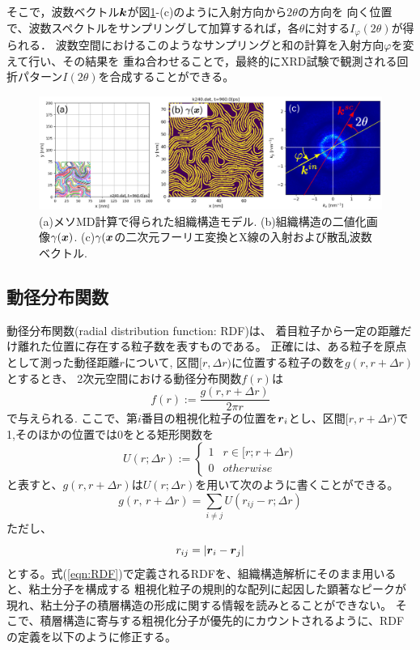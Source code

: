 そこで，波数ベクトル$\mbox{\boldmath $k$}$が図\ref{fig:fig5}-(c)のように入射方向から$2\theta$の方向を
向く位置で、波数スペクトルをサンプリングして加算するれば，各$\theta$に対する$I_\varphi(2\theta)$が得られる．
波数空間におけるこのようなサンプリングと和の計算を入射方向$\varphi$を変えて行い、その結果を
重ね合わせることで，最終的にXRD試験で観測される回折パターン$I(2\theta)$を合成することができる。
\begin{figure}[h]
	\begin{center}
	\includegraphics[width=1.0\linewidth]{Figs/fig5.eps} 
	\end{center}
	\caption{
		(a)メソMD計算で得られた組織構造モデル.
		(b)組織構造の二値化画像$\gamma(\mbox{\boldmath $x$})$. 
		(c)$\gamma(\mbox{\boldmath $x$}$の二次元フーリエ変換とX線の入射および散乱波数ベクトル.
	} 
	\label{fig:fig5}
\end{figure}
\subsection{動径分布関数}
動径分布関数(radial distribution function: RDF)は、
着目粒子から一定の距離だけ離れた位置に存在する粒子数を表すものである。
正確には、ある粒子を原点として測った動径距離$r$について,
区間$[r,\Delta r)$に位置する粒子の数を$g(r,r+\Delta r)$とするとき、
2次元空間における動径分布関数$f(r)$は
\begin{equation}
	f(r):=\frac{g(r,r+\Delta r)}{2\pi r}
	\label{eqn:RDF}
\end{equation}
で与えられる.
ここで、第$i$番目の粗視化粒子の位置を$\mbox{\boldmath $r$}_i$とし、区間$[r,r+\Delta r)$で
1,そのほかの位置では0をとる矩形関数を
\begin{equation}
	U(r;\Delta r):=\left\{
		\begin{array}{cc}
			1 &  r \in [r;r+\Delta r)\\
			0 &  otherwise
		\end{array}
	\right.
	\label{eqn:}
\end{equation}
と表すと、$g(r,r+\Delta r)$は$U(r;\Delta r)$を用いて次のように書くことができる。
\begin{equation}
	g(r,\,r+\Delta r)=\sum_{i\neq j} U(r_{ij}-r;\Delta r)
	\label{eqn:gr}
\end{equation}
ただし、
\begin{equation}
	r_{ij}=\left|\mbox{\boldmath $r$}_i-\mbox{\boldmath $r$}_j\right|
	\label{eqn:rij}
\end{equation}
とする。式(\ref{eqn:RDF})で定義されるRDFを、組織構造解析にそのまま用いると、粘土分子を構成する
粗視化粒子の規則的な配列に起因した顕著なピークが現れ、粘土分子の積層構造の形成に関する情報を読みとることができない。
そこで、積層構造に寄与する粗視化分子が優先的にカウントされるように、RDFの定義を以下のように修正する。

